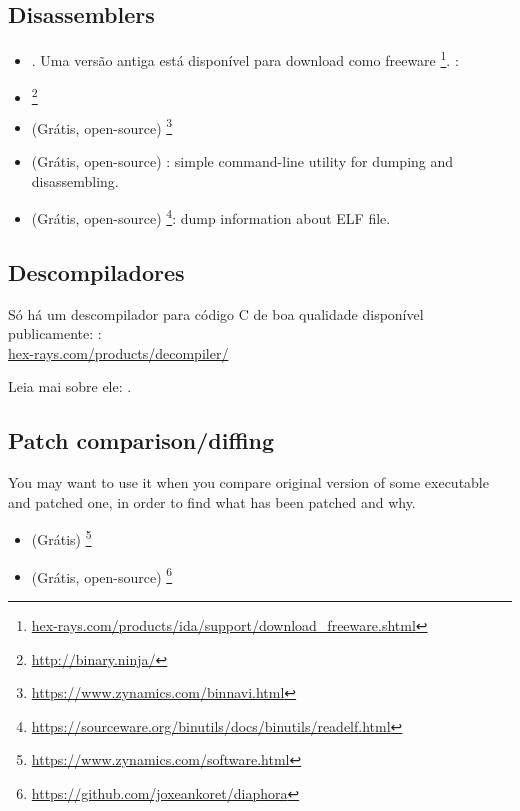 \subsection{Disassemblers}


\begin{itemize}
\item {}. Uma versão antiga está disponível para download como freeware
\footnote{\href{http://go.yurichev.com/17031}{hex-rays.com/products/ida/support/download\_freeware.shtml}}.
\ShortHotKeyCheatsheet: 

\item {}\footnote{\url{http://binary.ninja/}}

\item (Grátis, open-source) \footnote{\url{https://www.zynamics.com/binnavi.html}}

\item (Grátis, open-source) : simple command-line utility for dumping and disassembling.

\item (Grátis, open-source) \footnote{\url{https://sourceware.org/binutils/docs/binutils/readelf.html}}:
dump information about ELF file.
\end{itemize}

\subsection{Descompiladores}

Só há um descompilador para código C de boa qualidade disponível publicamente: :\\
\href{http://go.yurichev.com/17033}{hex-rays.com/products/decompiler/}

Leia mai sobre ele: .

\subsection{Patch comparison/diffing}

You may want to use it when you compare original version of some executable and patched one, in order to find
what has been patched and why.

\begin{itemize}
\item (Grátis) \footnote{\url{https://www.zynamics.com/software.html}}

\item (Grátis, open-source) \footnote{\url{https://github.com/joxeankoret/diaphora}}
\end{itemize}

